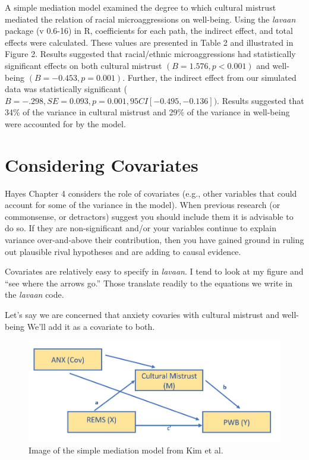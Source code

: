 \documentclass[
  11pt,
]{book}
\begin{document}
A simple mediation model examined the degree to which cultural mistrust mediated the relation of racial microaggressions on well-being. Using the \emph{lavaan} package (v 0.6-16) in R, coefficients for each path, the indirect effect, and total effects were calculated. These values are presented in Table 2 and illustrated in Figure 2. Results suggested that racial/ethnic microaggressions had statistically significant effects on both cultural mistrust \((B = 1.576, p < 0.001)\) and well-being \((B = -0.453, p = 0.001)\). Further, the indirect effect from our simulated data was statistically significant (\(B = -.298, SE = 0.093, p = 0.001, 95CI[-0.495,-0.136])\). Results suggested that 34\% of the variance in cultural mistrust and 29\% of the variance in well-being were accounted for by the model.

\hypertarget{considering-covariates}{%
\section{Considering Covariates}\label{considering-covariates}}

Hayes Chapter 4 \citeyearpar{hayes_introduction_2018} considers the role of covariates (e.g., other variables that could account for some of the variance in the model). When previous research (or commonsense, or detractors) suggest you should include them it is advisable to do so. If they are non-significant and/or your variables continue to explain variance over-and-above their contribution, then you have gained ground in ruling out plausible rival hypotheses and are adding to causal evidence.

Covariates are relatively easy to specify in \emph{lavaan}. I tend to look at my figure and ``see where the arrows go.'' Those translate readily to the equations we write in the \emph{lavaan} code.

Let's say we are concerned that anxiety covaries with cultural mistrust and well-being We'll add it as a covariate to both.

\begin{figure}
\centering
\includegraphics{images/SimpleMed/Kim_wCovs.jpg}
\caption{Image of the simple mediation model from Kim et al.}
\end{figure}
\end{document}
